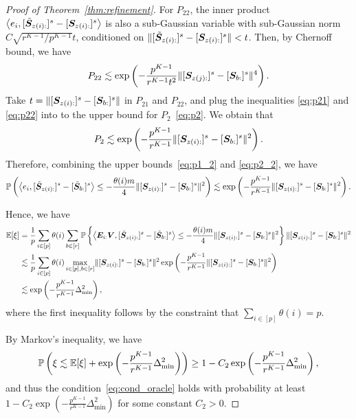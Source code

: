 \documentclass[lettersize,onecolumn,journal]{IEEEtran}
\theoremstyle{definition}
\theoremstyle{definition}
\newcommand{\of}[1]{\left(#1\right)}
\newcommand{\offf}[1]{\left\{#1\right\}}
\newcommand{\ang}[1]{\left\langle#1\right\rangle}
\begin{document}
\begin{proof}[Proof of Theorem~\ref{thm:refinement}]
    For $P_{22}$, the inner product $ \ang{e_i, [ \tilde  \mS_{z(i):} ]^s - [ \mS_{z(i):} ]^s}$ is also a sub-Gaussian variable with sub-Gaussian norm $ C \sqrt{ r^{K-1}/ p^{K-1} } t$, conditioned on $\lVert [ \tilde  {\bm S}_{z(i):} ]^s - [ \bm S_{z(i):} ]^s \rVert < t$. Then, by Chernoff bound, we have 
    \begin{equation}\label{eq:p22}
        P_{22} \lesssim \exp \of{  - \frac{p^{K-1}}{r^{K-1} t^2}   \onormSize{}{ [ \mS_{z(j):}  ]^s - [ \mS_{b:}  ]^s  }^4 }. 
    \end{equation}
    Take $t =  \lVert [ \bm S_{z(i):}  ]^s - [ \bm S_{b:}  ]^s  \rVert$ in $P_{21}$ and $P_{22}$, and plug the inequalities \eqref{eq:p21} and \eqref{eq:p22} into to the upper bound for $P_2$~\eqref{eq:p2}. We obtain that 
    \begin{equation}\label{eq:p2_2}
        P_2 \lesssim \exp \of{  - \frac{p^{K-1}}{r^{K-1}}   \onormSize{}{ [ \mS_{z(i):}  ]^s - [ \mS_{b:}  ]^s  }^2 }.
    \end{equation}
    Therefore, combining the upper bounds~\eqref{eq:p1_2} and \eqref{eq:p2_2}, we have 
    \begin{equation}\label{eq:xi_p}
          \bbP \of{ \ang{ e_i, [  \tilde \mS_{z(i):} ]^s - [  \tilde \mS_{b:} ]^s }  \leq - \frac{\theta(i) m}{4} \onormSize{}{ [ \mS_{z(i):}  ]^s - [ \mS_{b:}  ]^s  }^2} \lesssim  \exp \of{  - \frac{p^{K-1}}{r^{K-1}}   \onormSize{}{ [ \mS_{z(i):}  ]^s - [ \mS_{b:}  ]^s  }^2 }.
    \end{equation}
    
    Hence, we have 
    \begin{align}
        \bbE[\xi] & =  \frac{1}{p} \sum_{i \in [p]} \theta(i) \sum_{b \in [r]} \bbP \offf{  \ang{ \mE_{i:} \mV, [  \tilde \mS_{z(i):} ]^s - [  \tilde \mS_{b:} ]^s }  \leq - \frac{\theta(i) m}{4} \onormSize{}{ [ \mS_{z(i):}  ]^s - [ \mS_{b:}  ]^s  }^2 } \onormSize{}{ [ \mS_{z(i):}  ]^s - [ \mS_{ b:}  ]^s  }^2 \\
        &\lesssim \frac{1}{p} \sum_{i \in [p]}  \theta(i) \max_{i \in [p], b \in [r]}  \onormSize{}{ [ \mS_{z(i):}  ]^s - [ \mS_{b:}  ]^s  }^2   \exp \of{  - \frac{p^{K-1}}{r^{K-1}}   \onormSize{}{ [ \mS_{z(i):}  ]^s - [ \mS_{b:}  ]^s  }^2 } \\
        & \lesssim  \exp \of{  - \frac{p^{K-1}}{r^{K-1}}   \Delta_{\min}^2 },
    \end{align}
    where the first inequality follows by the constraint that $\sum_{i \in [p]} \theta(i) = p$.
    
    By Markov's inequality, we have 
    \begin{equation}
        \bbP\of{ \xi \lesssim \bbE[\xi] + \exp \of{  - \frac{p^{K-1}}{r^{K-1}}   \Delta_{\min}^2 } } \geq 1 -  C_2 \exp \of{  - \frac{p^{K-1}}{r^{K-1}}   \Delta_{\min}^2 },
    \end{equation}
    and thus the condition~\eqref{eq:cond_oracle} holds with probability at least $1 -  C_2 \exp \of{  - \frac{p^{K-1}}{r^{K-1}}   \Delta_{\min}^2 }$ for some constant $C_2 > 0$.
    

\end{proof}
\end{document}
